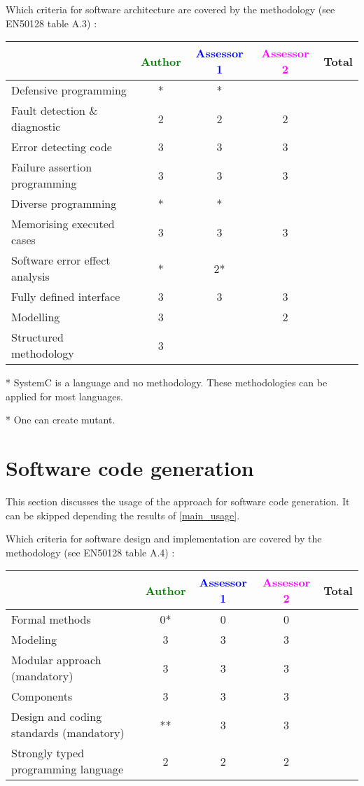 Which criteria for software architecture are covered by the methodology
(see EN50128 table A.3) :

\begin{tabular}{|l | c | c | c | c|}
\hline
& \textcolor{green}{Author} & \textcolor{blue}{Assessor 1} & \textcolor{magenta}{Assessor 2} & Total \\
\hline
Defensive programming &* &* & & \\
\hline
Fault detection \& diagnostic &2 &2 &2 & \\
\hline
Error detecting code &3 &3 &3 & \\
\hline
Failure assertion programming &3 &3 &3 & \\
\hline
Diverse programming &* &* & & \\
\hline
Memorising executed cases &3 &3 &3 & \\
\hline
Software error effect analysis &* &2* & & \\
\hline
Fully defined interface &3 &3 &3 & \\
\hline
Modelling &3 & &2 & \\
\hline
Structured methodology &3 & & & \\
\hline
\end{tabular}

\begin{author_comment}
 * SystemC is a language and no methodology. These methodologies can be applied for most languages.
\end{author_comment}
\begin{assessor1}
* One can create mutant.
\end{assessor1}

\section{Software code generation}
This section discusses the usage of the approach for software code generation.
It can be skipped depending the results of \ref{main_usage}.

Which criteria for software design and implementation are covered by the methodology
(see EN50128 table A.4) :

\begin{tabular}{|l | c | c | c | c|}
\hline
& \textcolor{green}{Author} & \textcolor{blue}{Assessor 1} & \textcolor{magenta}{Assessor 2} & Total \\
\hline
Formal methods &0* &0 &0 & \\
\hline
Modeling &3 &3 &3 & \\
\hline
Modular approach (mandatory) &3 &3 &3 & \\
\hline
Components &3 &3 &3 & \\
\hline
Design and coding standards (mandatory) &** &3 &3 & \\
\hline
Strongly typed programming language &2 &2 &2 & \\
\hline

\end{tabular}

